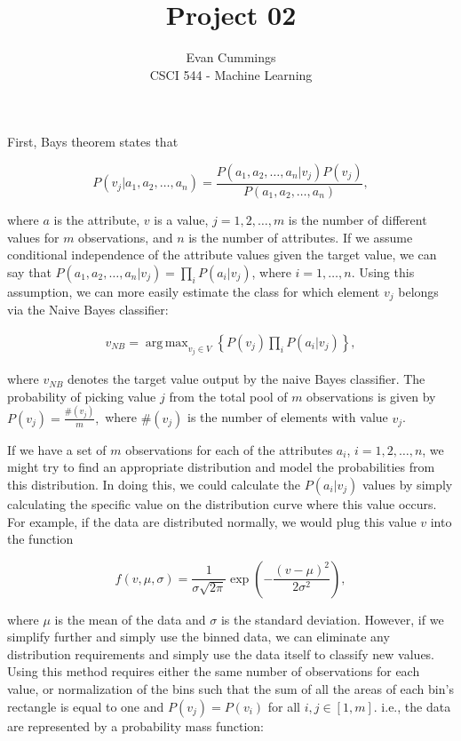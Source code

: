 
\DeclareMathOperator*{\argmax}{arg\,max}

\usepackage[top=.5in, bottom=.5in, left=.5in, right=.5in]{geometry}


\small

\title{Project 02}
\author{Evan Cummings\\
CSCI 544 - Machine Learning}

\maketitle

First, Bays theorem states that

$$ P(v_j | a_1, a_2, \ldots, a_n) = \frac{P(a_1, a_2, \ldots, a_n | v_j) P(v_j)}{P(a_1,a_2,\ldots,a_n)},$$

where $a$ is the attribute, $v$ is a value, $j = 1,2,\ldots,m$ is the number of different values for $m$ observations, and $n$ is the number of attributes.  If we assume conditional independence of the attribute values given the target value, we can say that $P(a_1, a_2, \ldots, a_n | v_j) = \prod_i P(a_i | v_j)$, where $i = 1,\ldots,n$.  Using this assumption, we can more easily estimate the class for which element $v_j$ belongs via the Naive Bayes classifier:

\begin{align}
  v_{NB} = \argmax_{v_j \in V}\left\{ P(v_j) \prod_i P(a_i | v_j) \right\},
\end{align}

where $v_{NB}$ denotes the target value output by the naive Bayes classifier.  The probability of picking value $j$ from the total pool of $m$ observations is given by $P(v_j) = \frac{\#(v_j)}{m},$ where $\#(v_j)$ is the number of elements with value $v_j$.

If we have a set of $m$ observations for each of the attributes $a_i$, $i = 1,2,\ldots,n$, we might try to find an appropriate distribution and model the probabilities from this distribution.  In doing this, we could calculate the $P(a_i | v_j)$ values by simply calculating the specific value on the distribution curve where this value occurs.  For example, if the data are distributed normally, we would plug this value $v$ into the function

$$f(v,\mu, \sigma) = \frac{1}{\sigma \sqrt{2\pi}} \exp\left( -\frac{(v-\mu)^2}{2\sigma^2} \right),$$

where $\mu$ is the mean of the data and $\sigma$ is the standard deviation.  However, if we simplify further and simply use the binned data, we can eliminate any distribution requirements and simply use the data itself to classify new values.  Using this method requires either the same number of observations for each value, or normalization of the bins such that the sum of all the areas of each bin's rectangle is equal to one and $P(v_j) = P(v_i)$ for all $i,j \in [1,m]$.  i.e., the data are represented by a probability mass function:

